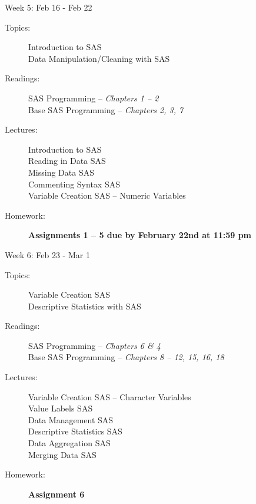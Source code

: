 \documentclass[11pt,article,oneside]{memoir}
\newcounter{schedule}
\begin{document}
\begin{schedule}{Week 5: Feb 16 - Feb 22}
\begin{description}
\item[Topics:] Introduction to SAS \\ Data Manipulation/Cleaning with SAS

\item[Readings:] SAS Programming -- \textit{Chapters 1 -- 2} \\
                 Base SAS Programming -- \textit{Chapters 2, 3, 7}

\item[Lectures:] Introduction to SAS \\ Reading in Data SAS \\ Missing Data SAS \\ Commenting Syntax SAS \\ Variable Creation SAS -- Numeric Variables

\item[Homework:] \textbf{Assignments 1 -- 5 due by February 22nd at 11:59 pm}

\end{description}
\end{schedule}
\begin{schedule}{Week 6: Feb 23 - Mar 1}
\begin{description}
\item[Topics:] Variable Creation SAS  \\ Descriptive Statistics with SAS

\item[Readings:] SAS Programming -- \textit{Chapters 6 \& 4} \\
                 Base SAS Programming -- \textit{Chapters 8 -- 12, 15, 16, 18}

\item[Lectures:] Variable Creation SAS -- Character Variables \\ Value Labels SAS \\ Data Management SAS \\ Descriptive Statistics SAS \\ Data Aggregation SAS \\  Merging Data SAS

\item[Homework:] \textbf{Assignment 6}

\end{description}
\end{schedule}
\end{document}
